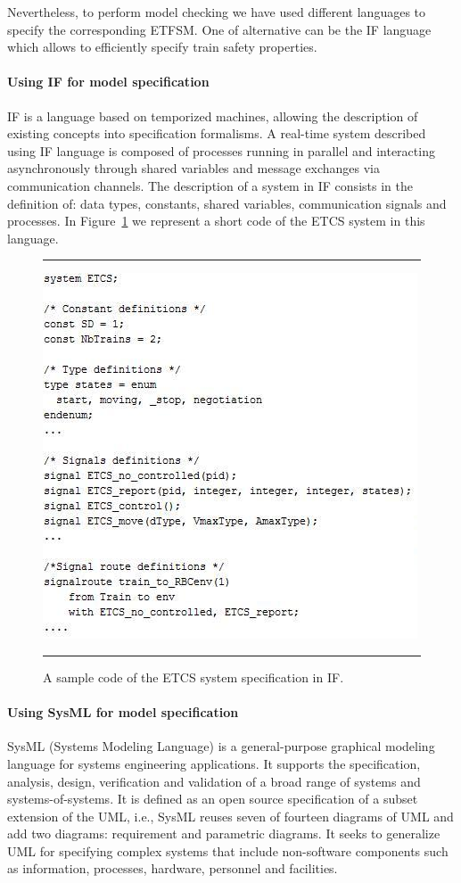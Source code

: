 \documentclass{template/openetcs_article}
\begin{document}
Nevertheless, to perform model checking we have used different languages to specify the corresponding ETFSM. One of alternative can be the IF language which allows to efficiently specify train safety properties. 

\paragraph{Using IF for model specification}

IF is a language based on temporized machines, allowing the description of existing concepts into specification formalisms.  A real-time system described using IF language is composed of processes running in parallel and interacting asynchronously through shared variables and message exchanges via communication channels. The description of a system in IF consists in the definition of: data types, constants, shared variables, communication signals and processes. In Figure~\ref{fig:if:specification} we represent a short code of the ETCS system in this language.

\begin{figure}[t]
\hrule
\sspace
\centering
  \includegraphics[width=.5\textwidth]{figures/test_generation.jpg}
  \caption{A sample code of the ETCS system specification in IF.}
  \label{fig:if:specification}
\sspace
\hrule
\end{figure}

\paragraph{Using SysML for model specification}

SysML (Systems Modeling Language) is a general-purpose graphical modeling language for systems engineering applications. It supports the specification, analysis, design, verification and validation of a broad range of systems and systems-of-systems. It is defined as an open source specification of a subset extension of the UML, i.e., SysML reuses seven of fourteen diagrams of UML and add two diagrams: requirement and parametric diagrams. It seeks to generalize UML for specifying complex systems that include non-software components such as information, processes, hardware, personnel and facilities.
\end{document}
